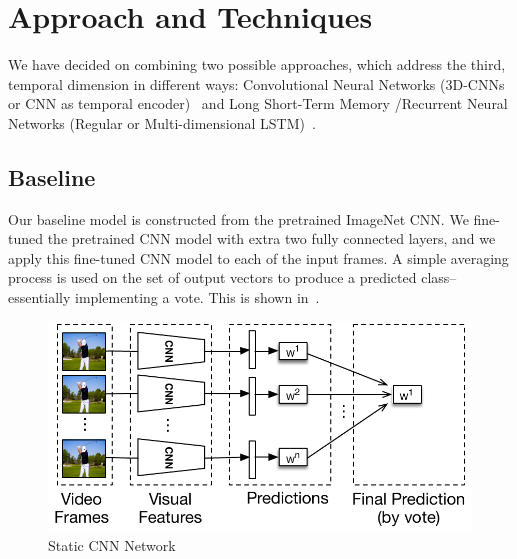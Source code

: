\section{Approach and Techniques}
We have decided on combining two possible approaches, which address
the third, temporal dimension in different ways: Convolutional Neural
Networks (3D-CNNs or CNN as temporal encoder)~\cite{stf,cnnvid,cnnMNLS} and Long
Short-Term Memory /Recurrent Neural Networks (Regular or Multi-dimensional LSTM)~\cite{ltrcn}. 

\subsection{Baseline}
Our baseline model is constructed from the pretrained ImageNet CNN. We fine-tuned the pretrained CNN model with extra two fully connected layers, and we apply this fine-tuned CNN model to each of the input frames. A simple averaging process is used on the set of output vectors to produce a predicted class-- essentially implementing a vote. This is shown in~. 
\begin{figure}
  \centering
  \includegraphics[width=1.0\linewidth]{figs/cnn}
  \caption{Static CNN Network}
  \label{fig:cnn}
\end{figure}



